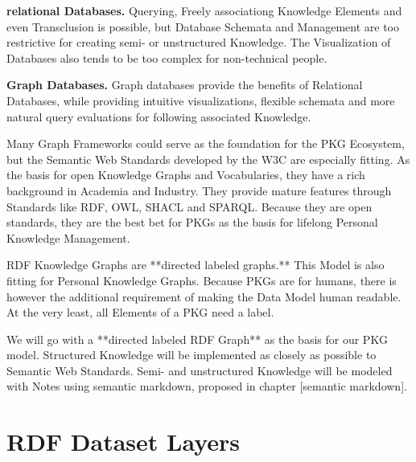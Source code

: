 \textbf{relational Databases.} Querying, Freely associationg Knowledge Elements and even Transclusion is possible, but Database Schemata and Management are too restrictive for creating semi- or unstructured Knowledge. The Visualization of Databases also tends to be too complex for non-technical people.

\textbf{Graph Databases.} Graph databases provide the benefits of Relational Databases, while providing intuitive visualizations, flexible schemata and more natural query evaluations for following associated Knowledge.

Many Graph Frameworks could serve as the foundation for the PKG Ecosystem, but the Semantic Web Standards developed by the W3C are especially fitting. As the basis for open Knowledge Graphs and Vocabularies, they have a rich background in Academia and Industry. They provide mature features through Standards like RDF, OWL, SHACL and SPARQL.
Because they are open standards, they are the best bet for PKGs as the basis for lifelong Personal Knowledge Management. 

RDF Knowledge Graphs are **directed labeled graphs.** This Model is also fitting for Personal Knowledge Graphs. Because PKGs are for humans, there is however the additional requirement of making the Data Model human readable. At the very least, all Elements of a PKG need a label.

We will go with a **directed labeled RDF Graph** as the basis for our PKG model. Structured Knowledge will be implemented as closely as possible to Semantic Web Standards. Semi- and unstructured Knowledge will be modeled with Notes using semantic markdown, proposed in chapter [semantic markdown].

\section{RDF Dataset Layers}

